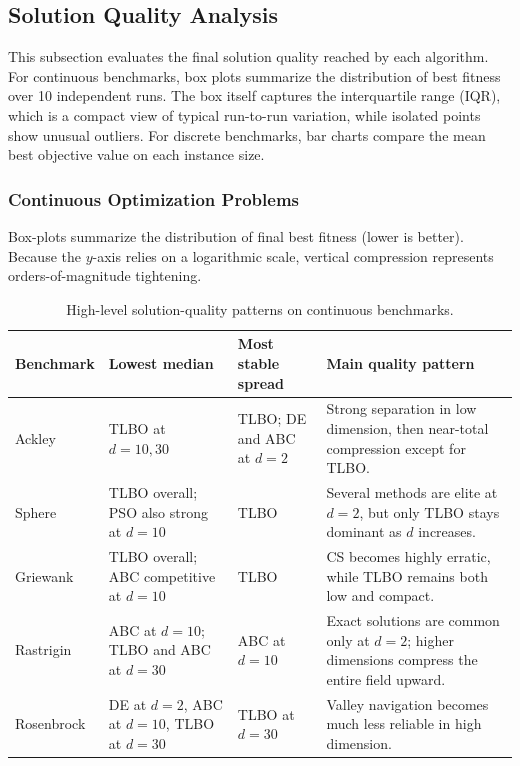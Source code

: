 \subsection{Solution Quality Analysis}

This subsection evaluates the final solution quality reached by each algorithm. For continuous benchmarks, box plots summarize the distribution of best fitness over 10 independent runs. The box itself captures the interquartile range (IQR), which is a compact view of typical run-to-run variation, while isolated points show unusual outliers. For discrete benchmarks, bar charts compare the mean best objective value on each instance size.

\subsubsection{Continuous Optimization Problems}

Box-plots summarize the distribution of final best fitness (lower is better). Because the $y$-axis relies on a logarithmic scale, vertical compression represents orders-of-magnitude tightening.

\begin{table}[H]
    \centering
    \small
    \begin{tabular}{|p{}|p{}|p{}|p{}|}
        \hline
        \textbf{Benchmark} & \textbf{Lowest median} & \textbf{Most stable spread} & \textbf{Main quality pattern} \\
        \hline
        Ackley & TLBO at $d=10,30$ & TLBO; DE and ABC at $d=2$ & Strong separation in low dimension, then near-total compression except for TLBO. \\
        \hline
        Sphere & TLBO overall; PSO also strong at $d=10$ & TLBO & Several methods are elite at $d=2$, but only TLBO stays dominant as $d$ increases. \\
        \hline
        Griewank & TLBO overall; ABC competitive at $d=10$ & TLBO & CS becomes highly erratic, while TLBO remains both low and compact. \\
        \hline
        Rastrigin & ABC at $d=10$; TLBO and ABC at $d=30$ & ABC at $d=10$ & Exact solutions are common only at $d=2$; higher dimensions compress the entire field upward. \\
        \hline
        Rosenbrock & DE at $d=2$, ABC at $d=10$, TLBO at $d=30$ & TLBO at $d=30$ & Valley navigation becomes much less reliable in high dimension. \\
        \hline
    \end{tabular}
    \caption{High-level solution-quality patterns on continuous benchmarks.}
    \label{tab:quality-cont-summary}
\end{table}


